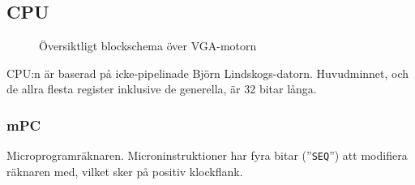 \documentclass[]{article}
\begin{document}
\newpage
\subsection{CPU}

\begin{figure}[h!]
	\caption{Översiktligt blockschema över VGA-motorn}
\end{figure}
\noindent
CPU:n är baserad på icke-pipelinade Björn Lindskogs-datorn. Huvudminnet, och de allra flesta register inklusive de generella, är 32 bitar långa.

\newpage
\subsubsection{mPC}

Microprogramräknaren. Microninstruktioner har fyra bitar (''\texttt{SEQ}'') att modifiera räknaren med, vilket sker på positiv klockflank.
\\
\end{document}
